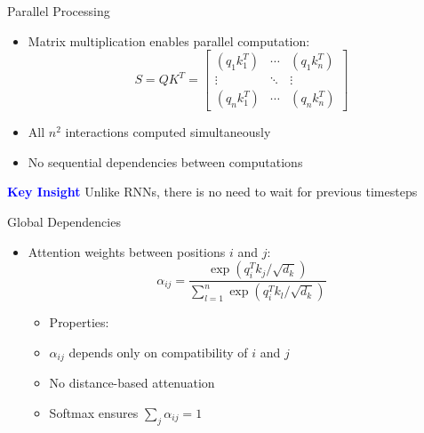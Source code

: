 \documentclass[serif, aspectratio=169]{beamer}
\begin{document}
\begin{frame}{Parallel Processing}
    \begin{itemize}
        \item Matrix multiplication enables parallel computation:
        \begin{equation*}
            S = QK^T = \begin{bmatrix}
            (q_1k_1^T) & \cdots & (q_1k_n^T) \\
            \vdots & \ddots & \vdots \\
            (q_nk_1^T) & \cdots & (q_nk_n^T)
            \end{bmatrix}
        \end{equation*}
        \item All $n^2$ interactions computed simultaneously
        \item No sequential dependencies between computations
    \end{itemize}
    \textcolor{blue}{\textbf{Key Insight}}
    \newline
        Unlike RNNs, there is no need to wait for previous timesteps
\end{frame}

\begin{frame}{Global Dependencies}
    \begin{itemize}
        \item Attention weights between positions $i$ and $j$:
        \begin{equation*}
            \alpha_{ij} = \frac{\exp(q_i^Tk_j/\sqrt{d_k})}{\sum_{l=1}^n \exp(q_i^Tk_l/\sqrt{d_k})}
        \end{equation*}
        \begin{itemize}
            \item Properties:
            \item $\alpha_{ij}$ depends only on compatibility of $i$ and $j$
            \item No distance-based attenuation
            \item Softmax ensures $\sum_j \alpha_{ij} = 1$
        \end{itemize}
    \end{itemize}
\end{frame}
\end{document}
